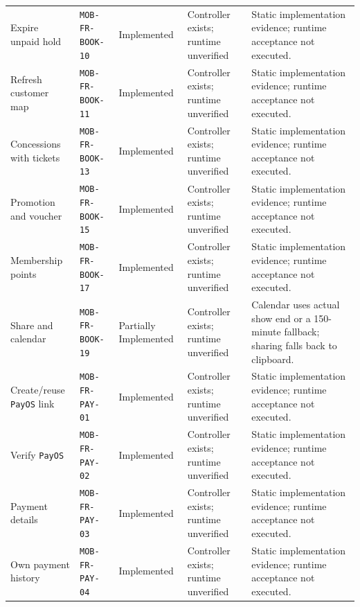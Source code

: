 \begin{longtable}{@{}P{0.19000\SRSWidth}P{0.18000\SRSWidth}P{0.15000\SRSWidth}P{0.20000\SRSWidth}P{0.28000\SRSWidth}@{}}
Expire unpaid hold & \texttt{MOB-\allowbreak{}FR-\allowbreak{}BOOK-\allowbreak{}10} & Implemented & Controller exists; runtime unverified & Static implementation evidence; runtime acceptance not executed. \\[3pt]
Refresh customer map & \texttt{MOB-\allowbreak{}FR-\allowbreak{}BOOK-\allowbreak{}11} & Implemented & Controller exists; runtime unverified & Static implementation evidence; runtime acceptance not executed. \\[3pt]
Concessions with tickets & \texttt{MOB-\allowbreak{}FR-\allowbreak{}BOOK-\allowbreak{}13} & Implemented & Controller exists; runtime unverified & Static implementation evidence; runtime acceptance not executed. \\[3pt]
Promotion and voucher & \texttt{MOB-\allowbreak{}FR-\allowbreak{}BOOK-\allowbreak{}15} & Implemented & Controller exists; runtime unverified & Static implementation evidence; runtime acceptance not executed. \\[3pt]
Membership points & \texttt{MOB-\allowbreak{}FR-\allowbreak{}BOOK-\allowbreak{}17} & Implemented & Controller exists; runtime unverified & Static implementation evidence; runtime acceptance not executed. \\[3pt]
Share and calendar & \texttt{MOB-\allowbreak{}FR-\allowbreak{}BOOK-\allowbreak{}19} & Partially Implemented & Controller exists; runtime unverified & Calendar uses actual show end or a 150-minute fallback; sharing falls back to clipboard. \\[3pt]
Create/\allowbreak{}reuse \texttt{Pay\allowbreak{}OS} link & \texttt{MOB-\allowbreak{}FR-\allowbreak{}PAY-\allowbreak{}01} & Implemented & Controller exists; runtime unverified & Static implementation evidence; runtime acceptance not executed. \\[3pt]
Verify \texttt{Pay\allowbreak{}OS} & \texttt{MOB-\allowbreak{}FR-\allowbreak{}PAY-\allowbreak{}02} & Implemented & Controller exists; runtime unverified & Static implementation evidence; runtime acceptance not executed. \\[3pt]
Payment details & \texttt{MOB-\allowbreak{}FR-\allowbreak{}PAY-\allowbreak{}03} & Implemented & Controller exists; runtime unverified & Static implementation evidence; runtime acceptance not executed. \\[3pt]
Own payment history & \texttt{MOB-\allowbreak{}FR-\allowbreak{}PAY-\allowbreak{}04} & Implemented & Controller exists; runtime unverified & Static implementation evidence; runtime acceptance not executed. \\[3pt]

\end{longtable}
